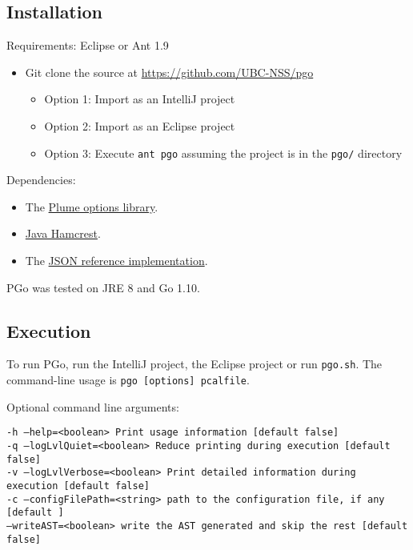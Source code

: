 \subsection{Installation}
Requirements: Eclipse or Ant 1.9

\begin{itemize}
\item Git clone the source at \url{https://github.com/UBC-NSS/pgo}

\begin{itemize}
\item Option 1: Import as an IntelliJ project

\item Option 2: Import as an Eclipse project

\item Option 3: Execute \texttt{ant pgo} assuming the project is in the \texttt{pgo/} directory
\end{itemize}
\end{itemize}

Dependencies:
\begin{itemize}
\item The \href{https://mernst.github.io/plume-lib/}
	{Plume options library}.

\item \href{http://hamcrest.org/JavaHamcrest/}
	{Java Hamcrest}.

\item The \href{https://github.com/stleary/JSON-java}
	{JSON reference implementation}.
\end{itemize}


PGo was tested on JRE 8 and Go 1.10.

\subsection{Execution}
To run PGo, run the IntelliJ project, the Eclipse project or run \texttt{pgo.sh}. The command-line usage is \texttt{pgo [options] pcalfile}.

Optional command line arguments:

\noindent
\texttt{-h --help=<boolean> Print usage information [default false]\\
	-q --logLvlQuiet=<boolean> Reduce printing during execution [default false]\\
	-v --logLvlVerbose=<boolean> Print detailed information during execution  [default false]\\
	-c --configFilePath=<string> path to the configuration file, if any [default ]\\
	--writeAST=<boolean> write the AST generated and skip the rest [default false]}

